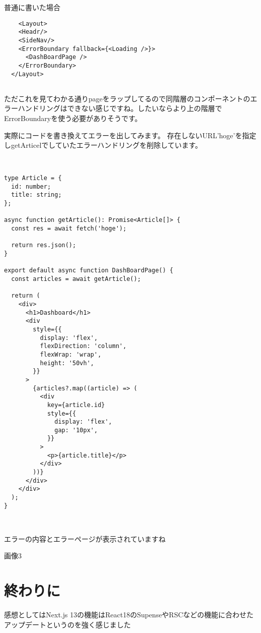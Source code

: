 普通に書いた場合



\begin{tcolorbox}[breakable]
  \begin{verbatim}
    <Layout>
    <Headr/>
    <SideNav/>
    <ErrorBoundary fallback={<Loading />}>
      <DashBoardPage />
    </ErrorBoundary>
  </Layout>
    
  \end{verbatim}
\end{tcolorbox}


ただこれを見てわかる通りpageをラップしてるので同階層のコンポーネントのエラーハンドリングはできない感じですね。したいならより上の階層でErrorBoundaryを使う必要がありそうです。

実際にコードを書き換えてエラーを出してみます。
存在しないURL'hoge'を指定しgetArticelでしていたエラーハンドリングを削除しています。


\begin{tcolorbox}[breakable]
  \begin{verbatim}

    
type Article = {
  id: number;
  title: string;
};

async function getArticle(): Promise<Article[]> {
  const res = await fetch('hoge');

  return res.json();
}

export default async function DashBoardPage() {
  const articles = await getArticle();

  return (
    <div>
      <h1>Dashboard</h1>
      <div
        style={{
          display: 'flex',
          flexDirection: 'column',
          flexWrap: 'wrap',
          height: '50vh',
        }}
      >
        {articles?.map((article) => (
          <div
            key={article.id}
            style={{
              display: 'flex',
              gap: '10px',
            }}
          >
            <p>{article.title}</p>
          </div>
        ))}
      </div>
    </div>
  );
}



  \end{verbatim}
\end{tcolorbox}


エラーの内容とエラーページが表示されていますね


画像3



\section{終わりに}
感想としてはNext.js 13の機能はReact18のSupenseやRSCなどの機能に合わせたアップデートというのを強く感じました